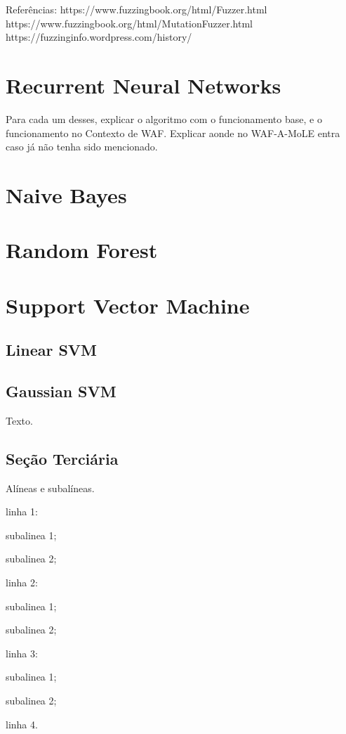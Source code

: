 Referências:
https://www.fuzzingbook.org/html/Fuzzer.html
https://www.fuzzingbook.org/html/MutationFuzzer.html
https://fuzzinginfo.wordpress.com/history/

\section{Recurrent Neural Networks}

Para cada um desses, explicar o algoritmo com o funcionamento base, e o funcionamento no Contexto de WAF. Explicar aonde no WAF-A-MoLE entra caso já não tenha sido mencionado. 

\section{Naive Bayes}

\section{Random Forest}

\section{Support Vector Machine}

\subsection{Linear SVM}

\subsection{Gaussian SVM}






Texto.

\subsection{Seção Terciária}

Alíneas e subalíneas.
\bigskip

\begin{alineas}
\item linha 1:
\begin{alineas}
\item subalinea 1;
\item subalinea 2;
\end{alineas}
\item linha 2:
\begin{subalineas}
\item subalinea 1;
\item subalinea 2;
\end{subalineas}
\item linha 3:
\begin{incisos}
\item subalinea 1;
\item subalinea 2;
\end{incisos}
\item linha 4.
\end{alineas}


